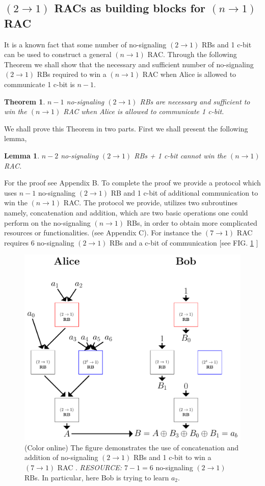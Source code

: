 \documentclass[%
 reprint,
 amsmath,amssymb,
 aps,
]{revtex4-1}
\newtheorem{mydef1}{Theorem}
\newtheorem{mydef2}{Lemma}
\begin{document}
\subsection*{$(2\rightarrow 1)$ RACs as building blocks for $(n\rightarrow1)$ RAC}
\noindent It is a known fact that some number of no-signaling $(2\rightarrow 1)$ RBs and 1 c-bit can be used to construct a general  $(n\rightarrow 1)$ RAC. Through the following Theorem we shall show that the necessary and sufficient number of no-signaling $(2\rightarrow 1)$ RBs required to win a  $(n\rightarrow 1)$ RAC when Alice is allowed to communicate 1 c-bit is $n-1$.
\begin{mydef1} \label{thm3}
$n-1$ no-signaling $(2\rightarrow 1)$ RBs  are necessary and sufficient to win the $(n\rightarrow 1)$ RAC when Alice is allowed to communicate 1 c-bit.
\end{mydef1} 
We shall prove this Theorem in two parts. First we shall present the following lemma,
\begin{mydef2} \label{lem:countRAC}
$n-2$ no-signaling $(2\rightarrow 1)$ RBs + 1 c-bit cannot win the  $(n\rightarrow 1)$ RAC.
\end{mydef2}
For the proof see Appendix B. To complete the proof we provide a protocol which uses $n-1$ no-signaling $(2\rightarrow 1)$ RB and 1 c-bit of additional communication to win the $(n\rightarrow 1)$ RAC. The protocol we provide, utilizes two subroutines namely, concatenation and addition, which are two basic operations one could perform on the no-signaling $(n\rightarrow1)$ RBs, in order to obtain more complicated resources or functionalities. (see Appendix C). For instance the $(7\rightarrow1)$ RAC requires 6 no-signaling $(2\rightarrow 1)$
RBs and a c-bit of communication [see FIG. \ref{7to1} ]
\begin{figure} 
\includegraphics[scale=0.5]{7.pdf}
\caption{ \label{7to1} (Color online) The figure demonstrates the use of concatenation and addition of no-signaling $(2\rightarrow 1)$
RBs and 1 c-bit
to win a $(7\rightarrow 1)$ RAC  . \textit{RESOURCE: $7-1=6$ } no-signaling $(2\rightarrow 1)$
RBs. In particular, here Bob is trying to learn $a_2$.}
\end{figure}
\end{document}
